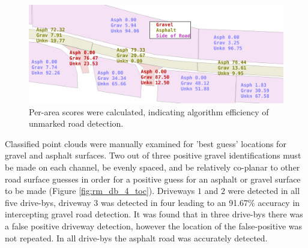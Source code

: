 \documentclass[journal,onecolumn]{IEEEtran}
\begin{document}

	\begin{figure}[H]
			\centering
			\includegraphics[width=0.975\linewidth]{figures/side_of_road_nums_4_with_filts_2}
			\caption[Post-Adjusted]{}
			\label{fig:prepostadjust}
		\caption[Area Scores]{Per-area scores were calculated, indicating algorithm efficiency of unmarked road detection. }
	\end{figure}

	{Classified point clouds were manually examined for 'best guess' locations for gravel and asphalt surfaces. Two out of three positive gravel identifications must be made on each channel, be evenly spaced, and be relatively co-planar to other road surface guesses in order for a positive guess for an asphalt or gravel surface to be made (Figure \ref{fig:rm_db_4_toc}). Driveways $1$ and $2$ were detected in all five drive-bys, driveway $3$ was detected in four leading to an 91.67\% accuracy in intercepting gravel road detection. It was found that in three drive-bys there was a false positive driveway detection, however the location of the false-positive was not repeated. In all drive-bys the asphalt road was accurately detected. }
	
\end{document}
